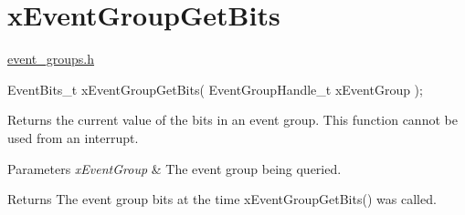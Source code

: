 \hypertarget{group__x_event_group_get_bits}{}\section{x\+Event\+Group\+Get\+Bits}
\label{group__x_event_group_get_bits}
\mbox{\hyperlink{event__groups_8h_source}{event\+\_\+groups.\+h}} 
\begin{DoxyPre}
   EventBits\_t xEventGroupGetBits( EventGroupHandle\_t xEventGroup );
\end{DoxyPre}


Returns the current value of the bits in an event group. This function cannot be used from an interrupt.


\begin{DoxyParams}{Parameters}
{\em x\+Event\+Group} & The event group being queried.\\
\hline
\end{DoxyParams}
\begin{DoxyReturn}{Returns}
The event group bits at the time x\+Event\+Group\+Get\+Bits() was called. 
\end{DoxyReturn}
